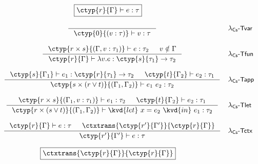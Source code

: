 \begin{figure*}[t]
%

\begin{equation*}
\boxed{\ctyp{r}{\Gamma} \vdash e : \tau }
\end{equation*}

\begin{equation*}
\begin{array}{cl}

\inference[]
  {}
  {\ctyp{0}{(v:\tau)} \vdash v : \tau }&
\textnormal{\rulest{var}}
\\[1.8em]
\inference
  {\ctyp{r \csprd s}{(\Gamma, v:\tau_1)} \vdash e : \tau_2 & v \notin \Gamma}
  {\ctyp{r}{\Gamma} \vdash \lambda v.e : \ctyp{s}{\tau_1} \rightarrow \tau_2 }&
\textnormal{\rulest{fun}}
\\[1.8em]
\inference
  {\ctyp{s}{\Gamma_1} \vdash e_1 : \ctyp{r}{\tau_1} \rightarrow \tau_2 &
   \ctyp{t}{\Gamma_2} \vdash e_2 : \tau_1 }
  {\ctyp{s \csprd (r \csvop t)}{(\Gamma_1, \Gamma_2)} \vdash e_1~e_2 : \tau_2}&
\textnormal{\rulest{app}}
\\[1.8em]
\inference
  {\ctyp{r \csprd s}{(\Gamma_1, v:\tau_1)} \vdash e_1 : \tau_2 &
  \ctyp{t}{\Gamma_2} \vdash e_2 : \tau_1}
  {\ctyp{r \csprd (s \csvop t)}{(\Gamma_1, \Gamma_2)} \vdash \kvd{let}~x=e_2~\kvd{in}~e_1 : \tau_2}&
\textnormal{\rulest{let}}
\\[1.8em]
\inference
  {\ctyp{r}{\Gamma} \vdash e : \tau &
   \ctxtrans{\ctyp{r'}{\Gamma'}}{\ctyp{r}{\Gamma}}}
  {\ctyp{r'}{\Gamma'} \vdash e : \tau}&
\textnormal{\rulest{ctx}}
\end{array}
\end{equation*}

%
%

\begin{equation*}
\boxed{\ctxtrans{\ctyp{r}{\Gamma}}{\ctyp{r}{\Gamma}} }
\end{equation*}


\end{figure*}
